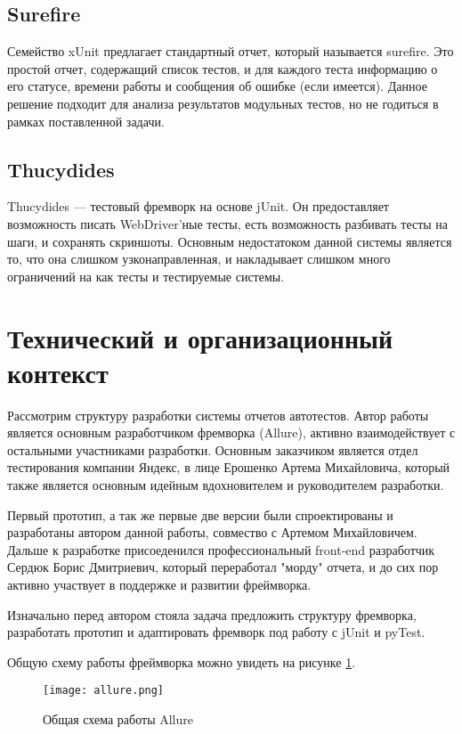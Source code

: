 \subsection{Surefire}
Семейство xUnit предлагает стандартный отчет, который называется surefire. Это простой отчет, содержащий список тестов, и для каждого теста информацию о его статусе, времени работы и сообщения об ошибке (если имеется). Данное решение подходит для анализа результатов модульных тестов, но не годиться в рамках поставленной задачи.

\subsection{Thucydides}
Thucydides --- тестовый фремворк на основе jUnit. Он предоставляет возможность писать WebDriver'ные тесты, есть возможность разбивать тесты на шаги, и сохранять скриншоты. Основным недостатоком данной системы является то, что она слишком узконаправленная, и накладывает слишком много ограничений на как тесты и тестируемые системы. 

\section{Технический и организационный контекст}
Рассмотрим структуру разработки системы отчетов автотестов. Автор работы является основным разработчиком фремворка (Allure), активно взаимодействует с остальными участниками разработки. Основным заказчиком является отдел тестирования компании Яндекс, в лице Ерошенко Артема Михайловича, который также является основным идейным вдохновителем и руководителем разработки. 

Первый прототип, а так же первые две версии были спроектированы и разработаны автором данной работы, совмество с Артемом Михайловичем. Дальше к разработке присоеденился профессиональный front-end разработчик Сердюк Борис Дмитриевич, который переработал "морду" отчета, и до сих пор активно участвует в поддержке и развитии фреймворка. 

Изначально перед автором стояла задача предложить структуру фремворка, разработать прототип и адаптировать фремворк под работу с jUnit и pyTest. 

Общую схему работы фреймворка можно увидеть на рисунке \ref{fig:allure}.

\begin{figure}[htb]
\centering
\texttt{[image: allure.png]}
\caption{Общая схема работы Allure}
\label{fig:allure}
\end{figure}

